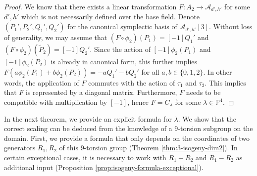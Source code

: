 \documentclass[11pt]{amsart}
\theoremstyle{definition}
\newcommand{\A}{\mathcal{A}}
\newcommand{\PP}{\mathbb{P}}
\newcommand{\diag}{\mathop{diag}}
\begin{document}
\begin{proof}
	We know that there exists a linear transformation $F:{A}_2 \to \A_{d',h'}$ for some $d',h'$ which is not necessarily defined over the base field. Denote $(P_1',P_2',Q_1',Q_2')$ for the canonical symplectic basis of $\A_{d',h'}[3]$. Without loss of generality, we may assume that $(F \circ\phi_2)({P}_1) = [-1] Q_1'$ and $(F\circ \phi_2)(\tilde{P}_2) = [-1]Q_2'$. Since the action of $[-1]\phi_2({P}_1)$ and $[-1]\phi_2({P}_2)$ is already in canonical form, this further implies $F(a\phi_2({P}_1) +b  \phi_2({P}_2)) = -aQ_1' - bQ_2'$ for all $a,b \in \{0,1,2\}$. In other words, the application of $F$ commutes with the action of $\tau_1$ and $\tau_2$. This implies that $F$ is represented by a diagonal matrix.  Furthermore, $F$ needs to be compatible with multiplication by $[-1]$, hence $F = C_{\lambda}$ for some $\lambda \in \PP^4$.
	
	
\end{proof}

In the next theorem, we provide an explicit formula for $\lambda$. We show that the correct scaling can be deduced from the knowledge of a $9$-torsion subgroup on the domain.
 First, we provide a formula that only depends on the coordinates of two generators $R_1,R_2$ of this $9$-torsion group (Theorem \ref{thm:3-isogeny-dim2}). In certain exceptional cases, it is necessary to work with $R_1 +R_2$ and $R_1 -R_2$ as additional input (Proposition \ref{prop:isogeny-formula-exceptional}). 
\end{document}

